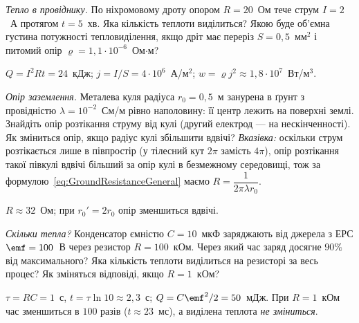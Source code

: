 \begin{problem}\label{prb:JouleLenz}
	\emph{Тепло в провіднику.} По ніхромовому дроту опором $R=20$~Ом тече струм $I=2$~А протягом $t=5$~хв. Яка кількість теплоти
	виділиться? Якою буде об'ємна густина потужності тепловиділення, якщо дріт має переріз $S=0{,}5$~мм$^2$ і питомий опір
	$\varrho=1{,}1\cdot10^{-6}$~Ом$\cdot$м?
	\begin{solution}
		$Q=I^2Rt=24$~кДж; $j=I/S=4\cdot10^{6}$~А/м$^2$; $w=\varrho j^2\approx1{,}8\cdot10^{7}$~Вт/м$^3$.
	\end{solution}
\end{problem}

\begin{problem}\label{prb:GroundResistanceSphere}
	\emph{Опір заземлення.} Металева куля радіуса $r_0=0{,}5$~м занурена в ґрунт з провідністю $\lambda=10^{-2}$~См/м рівно наполовину:
	її центр лежить на поверхні землі. Знайдіть опір розтікання струму від кулі (другий електрод — на нескінченності).
	Як зміниться опір, якщо радіус кулі збільшити вдвічі?
	\emph{Вказівка:} оскільки струм розтікається лише в півпростір (у тілесний кут $2\pi$ замість $4\pi$), опір розтікання такої півкулі вдвічі більший за опір кулі в безмежному середовищі, тож за формулою~\eqref{eq:GroundResistanceGeneral} маємо $R=\dfrac{1}{2\pi\lambda r_0}$.
	\begin{solution}
		$R\approx32$~Ом; при $r_0'=2r_0$ опір зменшиться вдвічі.
	\end{solution}
\end{problem}


\begin{problem}\label{prb:RCChargeHeat}
	\emph{Скільки тепла?} Конденсатор ємністю $C=10$~мкФ заряджають від джерела з ЕРС $\emf=100$~В через резистор $R=100$~кОм. Через який
	час заряд досягне $90\%$ від максимального? Яка кількість теплоти виділиться на резисторі за весь процес? Як зміняться відповіді, якщо
	$R=1$~кОм?
	\begin{solution}
		$\tau=RC=1$~с, $t=\tau\ln10\approx2{,}3$~с; $Q=C\emf^2/2=50$~мДж. При $R=1$~кОм час зменшиться в $100$ разів
		($t\approx23$~мс), а виділена теплота \emph{не зміниться}.
	\end{solution}
\end{problem}

